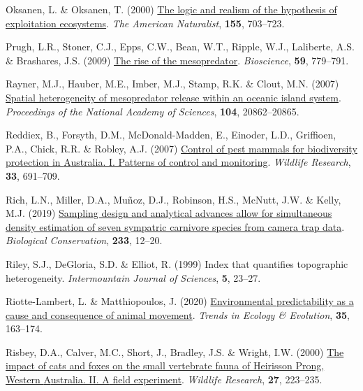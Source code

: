 \documentclass[preprint, 3p, authoryear]{elsarticle} %
\newlength{\cslhangindent}
\newlength{\cslentryspacingunit} %
\newenvironment{CSLReferences}[2] %
 {%
  \setlength{\parindent}{0pt}
  \ifodd #1
  \let\oldpar\par
  \def\par{\hangindent=\cslhangindent\oldpar}
  \fi
  \setlength{\parskip}{#2\cslentryspacingunit}
 }%
 {}
\begin{document}
\begin{CSLReferences}{1}{0}
\leavevmode{}%
Oksanen, L. \& Oksanen, T. (2000) \href{https://doi.org/10.1086/303354}{The logic and realism of the hypothesis of exploitation ecosystems}. \emph{The American Naturalist}, \textbf{155}, 703--723.

\leavevmode{}%
Prugh, L.R., Stoner, C.J., Epps, C.W., Bean, W.T., Ripple, W.J., Laliberte, A.S. \& Brashares, J.S. (2009) \href{https://doi.org/10.1525/bio.2009.59.9.9}{The rise of the mesopredator}. \emph{Bioscience}, \textbf{59}, 779--791.

\leavevmode{}%
Rayner, M.J., Hauber, M.E., Imber, M.J., Stamp, R.K. \& Clout, M.N. (2007) \href{https://doi.org/10.1073/pnas.0707414105}{Spatial heterogeneity of mesopredator release within an oceanic island system}. \emph{Proceedings of the National Academy of Sciences}, \textbf{104}, 20862--20865.

\leavevmode{}%
Reddiex, B., Forsyth, D.M., McDonald-Madden, E., Einoder, L.D., Griffioen, P.A., Chick, R.R. \& Robley, A.J. (2007) \href{https://doi.org/10.1071/WR05102}{Control of pest mammals for biodiversity protection in {{A}ustralia}. I. Patterns of control and monitoring}. \emph{Wildlife Research}, \textbf{33}, 691--709.

\leavevmode{}%
Rich, L.N., Miller, D.A., Muñoz, D.J., Robinson, H.S., McNutt, J.W. \& Kelly, M.J. (2019) \href{https://doi.org/10.1016/j.biocon.2019.02.018}{Sampling design and analytical advances allow for simultaneous density estimation of seven sympatric carnivore species from camera trap data}. \emph{Biological Conservation}, \textbf{233}, 12--20.

\leavevmode{}%
Riley, S.J., DeGloria, S.D. \& Elliot, R. (1999) Index that quantifies topographic heterogeneity. \emph{Intermountain Journal of Sciences}, \textbf{5}, 23--27.

\leavevmode{}%
Riotte-Lambert, L. \& Matthiopoulos, J. (2020) \href{https://doi.org/10.1016/j.tree.2019.09.009}{Environmental predictability as a cause and consequence of animal movement}. \emph{Trends in Ecology \& Evolution}, \textbf{35}, 163--174.

\leavevmode{}%
Risbey, D.A., Calver, M.C., Short, J., Bradley, J.S. \& Wright, I.W. (2000) \href{https://doi.org/10.1071/WR98092}{The impact of cats and foxes on the small vertebrate fauna of {Heirisson Prong, Western {A}ustralia. II. A} field experiment}. \emph{Wildlife Research}, \textbf{27}, 223--235.


\end{CSLReferences}
\end{document}
